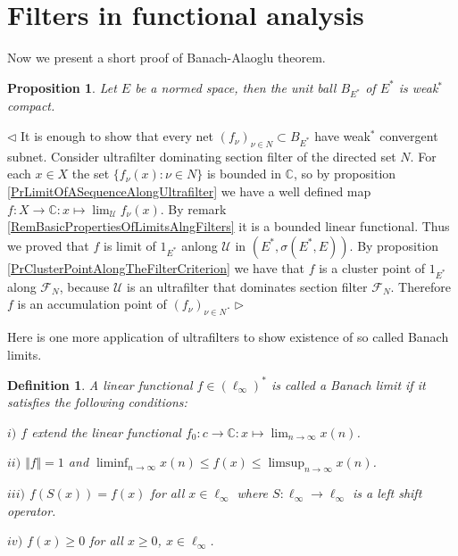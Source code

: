 \documentclass[12pt]{article}
\newtheorem{proposition}[theorem]{Proposition}
\newtheorem{definition}[theorem]{Definition}
\newenvironment{proof}{\par $\triangleleft$}{$\triangleright$}
\begin{document}
\section{Filters in functional analysis}

Now we present a short proof of Banach-Alaoglu theorem.

\begin{proposition}\label{PrBanachAlaoglu} Let $E$ be a normed space, then the unit ball $B_{E^*}$ of $E^*$ is weak${}^*$ compact.
\end{proposition}
\begin{proof} It is enough to show that every net $(f_\nu)_{\nu\in N}\subset B_{E^*}$ have weak${}^*$ convergent subnet. Consider ultrafilter dominating section filter of the directed set $N$. For each $x\in X$ the set $\{f_\nu(x):\nu\in N\}$ is bounded in $\mathbb{C}$, so by proposition \ref{PrLimitOfASequenceAlongUltrafilter} we have a well defined map $f: X\to\mathbb{C}: x\mapsto\lim_{\mathcal{U}}f_\nu(x)$. By remark \ref{RemBasicPropertiesOfLimitsAlngFilters} it is a bounded linear functional. Thus we proved that $f$ is limit of $1_{E^*}$ anlong $\mathcal{U}$ in $(E^*,\sigma(E^*, E))$. By proposition \ref{PrClusterPointAlongTheFilterCriterion}  we have that $f$ is a cluster point of $1_{E^*}$ along $\mathcal{F}_N$, because $\mathcal{U}$ is an ultrafilter that dominates section filter $\mathcal{F}_N$. Therefore $f$ is an accumulation point of $(f_\nu)_{\nu\in N}$. 
\end{proof}

Here is one more application of ultrafilters to show existence of so called Banach limits.

\begin{definition}\label{DefBanachLimit} A linear functional $f\in(\ell_\infty)^*$ is called a Banach limit if it satisfies the following conditions:

$i)$ $f$ extend the linear functional $f_0:c\to\mathbb{C}:x\mapsto \lim_{n\to\infty} x(n)$.

$ii)$ $\Vert f\Vert=1$ and $\liminf_{n\to\infty}x(n)\leq f(x)\leq \limsup_{n\to\infty} x(n)$.

$iii)$ $f(S(x))=f(x)$ for all $x\in\ell_\infty$ where $S:\ell_\infty\to\ell_\infty$ is a left shift operator.

$iv)$ $f(x)\geq 0$ for all $x\geq 0$, $x\in\ell_\infty$.
\end{definition}
\end{document}
